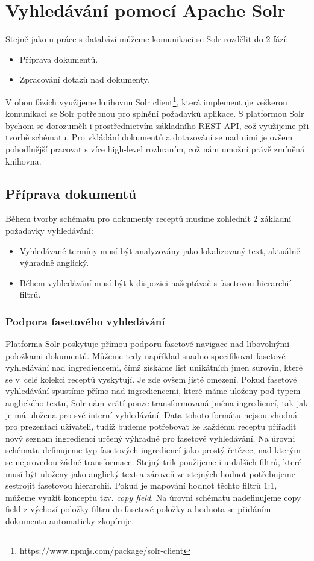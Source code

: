 \section{Vyhledávání pomocí Apache Solr}

Stejně jako u práce s databází můžeme komunikaci se Solr rozdělit do $2$ fází:
\begin{itemize}
    \item Příprava dokumentů.
    \item Zpracování dotazů nad dokumenty.
\end{itemize}

V obou fázích využijeme knihovnu Solr client\footnote{https://www.npmjs.com/package/solr-client}, která implementuje veškerou komunikaci se Solr potřebnou pro splnění požadavků aplikace. S platformou Solr bychom se dorozuměli i prostřednictvím základního REST API, což využijeme při tvorbě schématu. Pro vkládání dokumentů a dotazování se nad nimi je ovšem pohodlnější pracovat s více high-level rozhraním, což nám umožní právě zmíněná knihovna.

\subsection{Příprava dokumentů}

Během tvorby schématu pro dokumenty receptů musíme zohlednit $2$ základní požadavky vyhledávání:
\begin{itemize}
    \item Vyhledávané termíny musí být analyzovány jako lokalizovaný text, aktuálně výhradně anglický.
    \item Během vyhledávání musí být k dispozici našeptávač s fasetovou hierarchií filtrů.
\end{itemize}

\subsubsection{Podpora fasetového vyhledávání}

Platforma Solr poskytuje přímou podporu fasetové navigace nad libovolnými položkami dokumentů. Můžeme tedy například snadno specifikovat fasetové vyhledávání nad ingrediencemi, čímž získáme list unikátních jmen surovin, které se v~celé kolekci receptů vyskytují. Je zde ovšem jisté omezení. Pokud fasetové vyhledávání spustíme přímo nad ingrediencemi, které máme uloženy pod typem anglického textu, Solr nám vrátí pouze transformovaná jména ingrediencí, tak jak je má uložena pro své interní vyhledávání. Data tohoto formátu nejsou vhodná pro prezentaci uživateli, tudíž budeme potřebovat ke každému receptu přiřadit nový seznam ingrediencí určený výhradně pro fasetové vyhledávání. Na úrovni schématu definujeme typ fasetových ingrediencí jako prostý řetězec, nad kterým se neprovedou žádné transformace. Stejný trik použijeme i u dalších filtrů, které musí být uloženy jako anglický text a zároveň ze stejných hodnot potřebujeme sestrojit fasetovou hierarchii. Pokud je mapování hodnot těchto filtrů $1$:$1$, můžeme využít konceptu tzv. \emph{copy field}. Na úrovni schématu nadefinujeme copy field z výchozí položky filtru do fasetové položky a hodnota se přidáním dokumentu automaticky zkopíruje.

